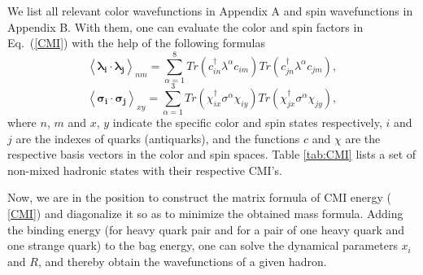 \documentclass[prd,twocolumn,floatfix,nofootinbib]{revtex4}
\begin{document}
We list all relevant color wavefunctions in Appendix A and spin
wavefunctions in Appendix B. With them, one can evaluate the color and spin
factors in Eq.~(\ref{CMI}) with the help of the following formulas
\begin{equation}
{\left\langle \boldsymbol{\lambda _{i}}\cdot \boldsymbol{\lambda _{j}}%
\right\rangle }_{nm}=\sum_{\alpha =1}^{8}Tr\left( c_{in}^{\dagger }\lambda
^{\alpha }c_{im}\right) Tr\left( c_{jn}^{\dagger }\lambda ^{\alpha
}c_{jm}\right) ,  \label{colorfc}
\end{equation}%
\begin{equation}
{\left\langle \boldsymbol{\sigma _{i}}\cdot \boldsymbol{\sigma _{j}}%
\right\rangle }_{xy}=\sum_{\alpha =1}^{3}Tr\left( \chi _{ix}^{\dagger
}\sigma ^{\alpha }\chi _{iy}\right) Tr\left( \chi _{jx}^{\dagger }\sigma
^{\alpha }\chi _{jy}\right) ,  \label{spinfc}
\end{equation}%
where $n$, $m$ and $x$, $y$ indicate the specific color and spin states
respectively, $i$ and $j$ are the indexes of quarks (antiquarks), and the
functions $c$ and $\chi $ are the respective basis vectors in the color and
spin spaces. Table \ref{tab:CMI} lists a set of non-mixed hadronic states
with their respective CMI's.

Now, we are in the position to construct the matrix formula of CMI energy (%
\ref{CMI}) and diagonalize it so as to minimize the obtained mass formula.
Adding the binding energy (for heavy quark pair and for a pair of one heavy
quark and one strange quark) to the bag energy, one can solve the dynamical
parameters $x_{i}$ and $R$, and thereby obtain the wavefunctions of a given
hadron.
\end{document}
